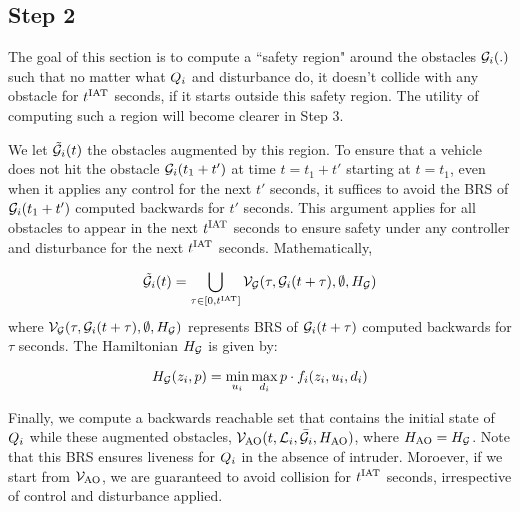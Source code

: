 \subsection{Step 2}
The goal of this section is to compute a ``safety region" around the obstacles $\mathcal{G}_i(.)$ such that no matter what $Q_{i}$ and disturbance do, it doesn't collide with any obstacle for $t^\text{IAT}$ seconds, if it starts outside this safety region. The utility of computing such a region will become clearer in Step 3. 

We let $\tilde{\mathcal{G}}_i(t)$ the obstacles augmented by this region. To ensure that a vehicle does not hit the obstacle $\mathcal{G}_i(t_1 + t')$ at time $t = t_1 + t'$ starting at $t = t_1$, even when it applies any control for the next $t'$ seconds, it suffices to avoid the BRS of $\mathcal{G}_i(t_1 + t')$ computed backwards for $t'$ seconds. This argument applies for all obstacles to appear in the next $t^\text{IAT}$ seconds to ensure safety under any controller and disturbance for the next $t^\text{IAT}$ seconds. Mathematically,

\begin{equation} \label{eqn:inducedobs}
\tilde{\mathcal{G}}_i(t) = \bigcup_{\tau \in [0, t^\text{IAT}]} \mathcal{V}_{\mathcal{G}}(\tau, \mathcal{G}_i(t+\tau), \emptyset, H_{\mathcal{G}})
\end{equation}
where $\mathcal{V}_{\mathcal{G}}(\tau, \mathcal{G}_i(t+\tau), \emptyset, H_{\mathcal{G}})$ represents BRS of $\mathcal{G}_i(t+\tau)$ computed backwards for $\tau$ seconds. The Hamiltonian 
$H_{\mathcal{G}}$ is given by:

\begin{equation} \label{eqn:BRSham}
H_{\mathcal{G}}(z_i, p) = \min_{u_i} \max_{d_i} p \cdot f_i (z_i, u_i, d_i)
\end{equation}

Finally, we compute a backwards reachable set that contains the initial state of $Q_{i}$ while these augmented obstacles, $\mathcal{V}_\text{AO}(t, \mathcal{L}_i, \bar{\mathcal{G}}_i, H_\text{AO})$, where $H_\text{AO} = H_{\mathcal{G}}$. Note that this BRS ensures liveness for $Q_{i}$ in the absence of intruder. Moroever, if we start from $\mathcal{V}_\text{AO}$, we are guaranteed to avoid collision for $t^\text{IAT}$ seconds, irrespective of control and disturbance applied. 